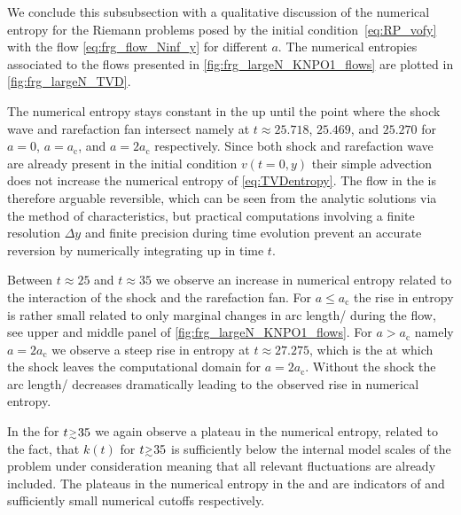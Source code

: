 We conclude this subsubsection with a qualitative discussion of the numerical entropy for the Riemann problems posed by the initial condition~\eqref{eq:RP_vofy} with the flow \cref{eq:frg_flow_Ninf_y} for different $a$.
The numerical entropies associated to the flows presented in \cref{fig:frg_largeN_KNPO1_flows} are plotted in \cref{fig:frg_largeN_TVD}.

The numerical entropy stays constant in the \uv{} up until the point where the shock wave and rarefaction fan intersect namely at $t \approx 25.718$, $25.469$, and $25.270$ for $a = 0$, $a = a_\mathrm{c}$, and $a = 2 a_\mathrm{c}$ respectively.
Since both shock and rarefaction wave are already present in the initial condition $v(t=0,y)$ their simple advection does not increase the numerical entropy of \cref{eq:TVDentropy}.
The flow in the \uv{} is therefore arguable reversible, which can be seen from the analytic solutions via the method of characteristics, but practical computations involving a finite resolution $\Delta y$ and finite precision during time evolution prevent an accurate reversion by numerically integrating up in time $t$.

Between $t \approx 25$ and $t \approx 35$ we observe an increase in numerical entropy related to the interaction of the shock and the rarefaction fan.
For $a\leq a_\mathrm{c}$ the rise in entropy is rather small related to only marginal changes in arc length/\tv{} during the flow, see upper and middle panel of \cref{fig:frg_largeN_KNPO1_flows}.
For $a>a_\mathrm{c}$ namely $a=2a_\mathrm{c}$ we observe a steep rise in entropy at $t\approx 27.275$, which is the \rgtime{} at which the shock leaves the computational domain for $a=2a_\mathrm{c}$. Without the shock the arc length/\tv{} decreases dramatically leading to the observed rise in numerical entropy.

In the \ir{} for $t \smallergtrsim 35$ we again observe a plateau in the numerical entropy, related to the fact, that $k(t)$ for $t \smallergtrsim 35$ is sufficiently below the internal model scales of the problem under consideration meaning that all relevant fluctuations are already included.
The plateaus in the numerical entropy in the \uv{} and \ir{} are indicators of \rgcy{} and sufficiently small numerical \ir{} cutoffs respectively.

\FloatBarrier
